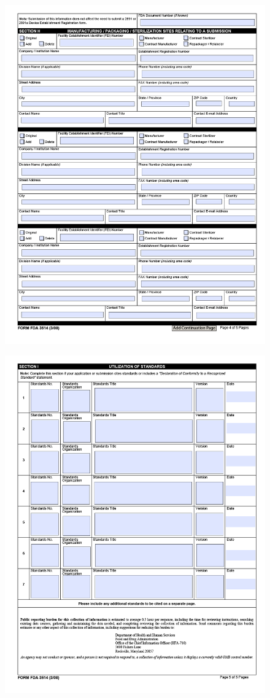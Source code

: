 \begin{figure}[H]
  \centering
  \includegraphics[width=\linewidth]{pages/cdrh-pics/4}
  \label{fig:summary}
\end{figure}

\begin{figure}[H]
  \centering
  \includegraphics[width=\linewidth]{pages/cdrh-pics/5}
  \label{fig:summary}
\end{figure}

